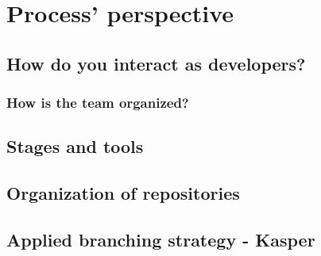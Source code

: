 \section{Process' perspective}
\subsection{How do you interact as developers?}
\subsubsection{How is the team organized?}
\subsection{Stages and tools}
\subsection{Organization of repositories}
\subsection{Applied branching strategy - Kasper}